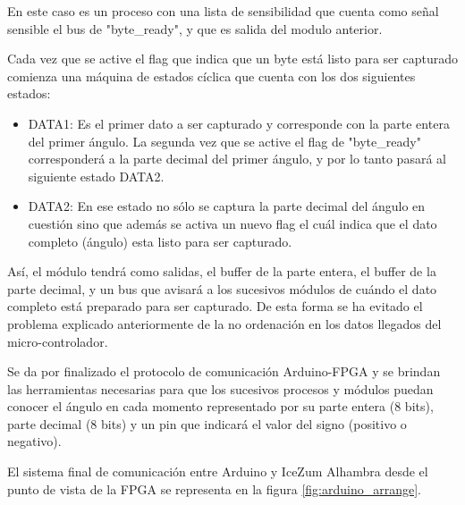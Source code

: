En este caso es un proceso con una lista de sensibilidad que cuenta como señal sensible el bus de "byte\_ready", y que es salida del modulo anterior. \newline

Cada vez que se active el flag que indica que un byte está listo para ser capturado comienza una máquina de estados cíclica que cuenta con los dos siguientes estados:

\begin{itemize}
	\item DATA1: Es el primer dato a ser capturado y corresponde con la parte entera del primer ángulo. La segunda vez que se active el flag de "byte\_ready" corresponderá a la parte decimal del primer ángulo, y por lo tanto pasará al siguiente estado DATA2.
	\item DATA2: En ese estado no sólo se captura la parte decimal del ángulo en cuestión sino que además se activa un nuevo flag el cuál indica que el dato completo (ángulo) esta listo para ser capturado. 
\end{itemize}

Así, el módulo tendrá como salidas, el buffer de la parte entera, el buffer de la parte decimal, y un bus que avisará a los sucesivos módulos de cuándo el dato completo está preparado para ser capturado. De esta forma se ha evitado el problema explicado anteriormente de la no ordenación en los datos llegados del micro-controlador.  \newline

Se da por finalizado el protocolo de comunicación Arduino-FPGA y se brindan las herramientas necesarias para que los sucesivos procesos y módulos puedan conocer el ángulo en cada momento representado por su parte entera (8 bits), parte decimal (8 bits) y un pin que indicará el valor del signo (positivo o negativo).

El sistema final de comunicación entre Arduino y IceZum Alhambra desde el punto de vista de la FPGA se representa en la figura \ref{fig:arduino_arrange}.


